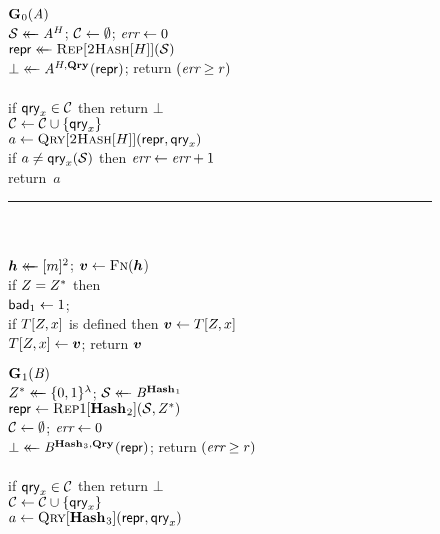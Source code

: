 {\begin{figure*}
  {
    \underline{$\game_0(\advA)$}\\[2pt]
      $\col \getsr \advA^H$; $\setC \gets \emptyset$; $\err \gets 0$\\
      $\pub \getsr \Rep[\hashbf[H]](\col)$\\
      $\bot \getsr \advA^{H,\QRYO}(\pub)$;
      return $(\err \geq r)$
    \\[6pt]
    \\[2pt]
      if $\qry_x \in \mathcal{C}$ then return $\bot$\\
      $\setC \gets \setC \union \{\qry_x\}$\\
      $a \gets \Qry[\hashbf[H]](\pub, \qry_x)$\\
      if $a \neq \qry_x(\col)$ then $\err \gets \err + 1$\\
      return~$a$
    \\[4pt]
    \hspace*{-4pt}\rule{1.043\textwidth}{.4pt}
    \\[5pt]
     \hfill{}\hspace*{3pt}\\
      $\hh \getsr [m]^2$; $\vv \gets \fff(\hh$)\\
      if $\salt = \salt^*$ then\\
      \tab $\bad_1 \gets 1$; \\
      if $T[\salt,x]$ is defined then $\vv \gets T[\salt,x]$\\
      $T[\salt,x] \gets \vv$;
      return $\vv$
  }
  { %
    \underline{$\game_1(\advB)$}\\[2pt]
      $\salt^* \getsr \bits^\lambda$;
      $\col \getsr \advB^{\HASHO_1}$\\
      $\pub \gets \Repx[\HASHO_2](\col, \salt^*)$\\
      $\setC \gets \emptyset$;
      $\err \gets 0$\\
      $\bot \getsr \advB^{\HASHO_3,\QRYO}(\pub)$;
      return $(\err \geq r)$
    \\[6pt]
    \\[2pt]
      if $\qry_x \in \mathcal{C}$ then return $\bot$\\
      $\setC \gets \setC \cup \{\qry_x\}$\\
      $a \gets \Qry[\HASHO_3](\pub, \qry_x)$\\
}
\end{figure*}}
